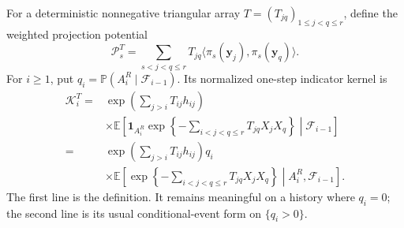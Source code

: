 For a deterministic nonnegative triangular array
\(T=(T_{jq})_{1\le j<q\le r}\), define the weighted projection potential
\[
 \mathcal P_s^T=
 \sum_{s<j<q\le r}T_{jq}
 \langle\pi_s(\boldsymbol y_j),\pi_s(\boldsymbol y_q)\rangle.
\tag{2.32}
\]
For \(i\ge1\), put
\(q_i=\mathbb P(A_i^R\mid\mathcal F_{i-1})\).  Its normalized one-step
indicator kernel is
\[
\begin{aligned}
 \mathcal K_i^T={}&
 \exp\!\left(\sum_{j>i}T_{ij}h_{ij}\right)\\
 &\times
 \mathbb E\!\left[\mathbf 1_{A_i^R}
 \exp\!\left\{-\sum_{i<j<q\le r}T_{jq}X_jX_q\right\}
 \middle|\mathcal F_{i-1}\right]\\
={}&\exp\!\left(\sum_{j>i}T_{ij}h_{ij}\right)
 q_i\\
 &\times
 \mathbb E\!\left[
 \exp\!\left\{-\sum_{i<j<q\le r}T_{jq}X_jX_q\right\}
 \middle|A_i^R,\mathcal F_{i-1}\right].
\end{aligned}
\tag{2.33}
\]
The first line is the definition.  It remains meaningful on a history where
\(q_i=0\); the second line is its usual conditional-event form on
\(\{q_i>0\}\).

